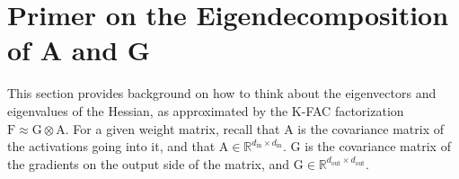 \documentclass{article} %
\newcommand{\matr}[1]{\ensuremath{\bm{\mathrm{#1}}}}
\newcommand{\kfac}{\ensuremath{\matr{F}\approx\matr{G} \otimes \matr{A}}}
\newcommand{\RR}{\mathbb{R}}
\begin{document}


\section{Primer on the Eigendecomposition of A and G}
\label{sec:eigen_primer}
This section provides background on how to think about the eigenvectors and eigenvalues of the Hessian, as approximated by the K-FAC factorization $\kfac$. For a given weight matrix, recall that $\matr{A}$ is the covariance matrix of the activations going into it, and that 
$\matr{A}\in \RR^{d_{\text{in}} \times d_{\text{in}}}$. 
\matr{G} is the covariance matrix of the gradients on the output side of the matrix, and $\matr{G}\in \RR^{d_{\text{out}} \times d_{\text{out}}}$.
\end{document}

